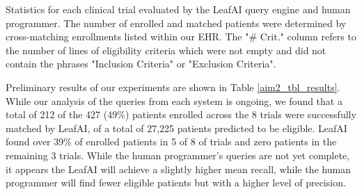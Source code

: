 \documentclass[../main.tex]{subfiles}
\begin{document}
\begin{table}[h!]
    \footnotesize
    \centering
    
    \caption{Statistics for each clinical trial evaluated by the LeafAI query engine and human programmer. The number of enrolled and matched patients were determined by cross-matching enrollments listed within our EHR. The "\# Crit." column refers to the number of lines of eligibility criteria which were not empty and did not contain the phrases "Inclusion Criteria" or "Exclusion Criteria".}
    \label{aim2_tbl_results}
\end{table} 

Preliminary results of our experiments are shown in Table \ref{aim2_tbl_results}. While our analysis of the queries from each system is ongoing, we found that a total of 212 of the 427 (49\%) patients enrolled across the 8 trials were successfully matched by LeafAI, of a total of 27,225 patients predicted to be eligible. LeafAI found over 39\% of enrolled patients in 5 of 8 of trials and zero patients in the remaining 3 trials. While the human programmer's queries are not yet complete, it appears the LeafAI will achieve a slightly higher mean recall, while the human programmer will find fewer eligible patients but with a  higher level of precision.

\end{document}
